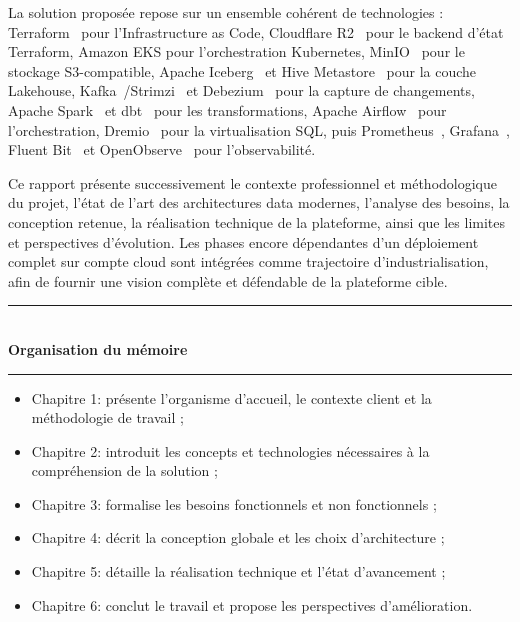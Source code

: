 La solution proposée repose sur un ensemble cohérent de technologies : Terraform~\cite{terraform} pour l'Infrastructure as Code, Cloudflare R2~\cite{cloudflare-r2} pour le backend d'état Terraform, Amazon EKS pour l'orchestration Kubernetes, MinIO~\cite{minio} pour le stockage S3-compatible, Apache Iceberg~\cite{apache-iceberg} et Hive Metastore~\cite{apache-hive} pour la couche Lakehouse, Kafka~\cite{apache-kafka}/Strimzi~\cite{strimzi} et Debezium~\cite{debezium} pour la capture de changements, Apache Spark~\cite{apache-spark} et dbt~\cite{dbt} pour les transformations, Apache Airflow~\cite{apache-airflow} pour l'orchestration, Dremio~\cite{dremio} pour la virtualisation SQL, puis Prometheus~\cite{prometheus}, Grafana~\cite{grafana}, Fluent Bit~\cite{fluent-bit} et OpenObserve~\cite{openobserve} pour l'observabilité.

Ce rapport présente successivement le contexte professionnel et méthodologique du projet, l'état de l'art des architectures data modernes, l'analyse des besoins, la conception retenue, la réalisation technique de la plateforme, ainsi que les limites et perspectives d'évolution. Les phases encore dépendantes d'un déploiement complet sur compte cloud sont intégrées comme trajectoire d'industrialisation, afin de fournir une vision complète et défendable de la plateforme cible.

\vspace{0.25cm}

\begin{center}
{\color{softline}\rule{0.26\textwidth}{0.7pt}}\\[0.2cm]
\textbf{\large Organisation du mémoire}\\[-0.1cm]
{\color{softline}\rule{0.26\textwidth}{0.7pt}}
\end{center}

\vspace{0.05cm}

\begin{itemize}[leftmargin=1.2cm, itemsep=0.28em]
    \item Chapitre 1: présente l'organisme d'accueil, le contexte client et la méthodologie de travail ;
    \item Chapitre 2: introduit les concepts et technologies nécessaires à la compréhension de la solution ;
    \item Chapitre 3: formalise les besoins fonctionnels et non fonctionnels ;
    \item Chapitre 4: décrit la conception globale et les choix d'architecture ;
    \item Chapitre 5: détaille la réalisation technique et l'état d'avancement ;
    \item Chapitre 6: conclut le travail et propose les perspectives d'amélioration.
\end{itemize}

\endgroup

\clearpage
